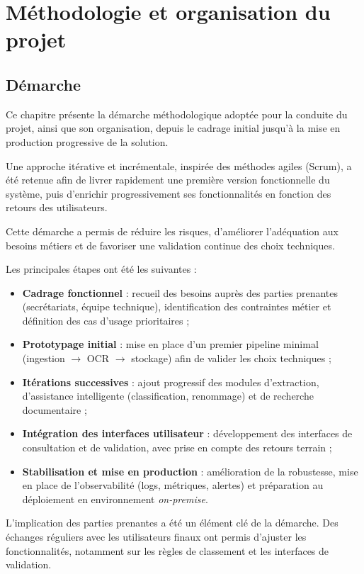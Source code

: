 \documentclass[12pt,a4paper]{report}
\begin{document}
\chapter{Méthodologie et organisation du projet}
\section{Démarche}
Ce chapitre présente la démarche méthodologique adoptée pour la conduite du projet, ainsi que son organisation, depuis le cadrage initial jusqu’à la mise en production progressive de la solution.

Une approche itérative et incrémentale, inspirée des méthodes agiles (Scrum), a été retenue afin de livrer rapidement une première version fonctionnelle du système, puis d’enrichir progressivement ses fonctionnalités en fonction des retours des utilisateurs.

Cette démarche a permis de réduire les risques, d’améliorer l’adéquation aux besoins métiers et de favoriser une validation continue des choix techniques.

Les principales étapes ont été les suivantes :
\begin{itemize}
  \item \textbf{Cadrage fonctionnel} : recueil des besoins auprès des parties prenantes (secrétariats, équipe technique), identification des contraintes métier et définition des cas d’usage prioritaires ;
  \item \textbf{Prototypage initial} : mise en place d’un premier pipeline minimal (ingestion $\rightarrow$ OCR $\rightarrow$ stockage) afin de valider les choix techniques ;
  \item \textbf{Itérations successives} : ajout progressif des modules d’extraction, d’assistance intelligente (classification, renommage) et de recherche documentaire ;
  \item \textbf{Intégration des interfaces utilisateur} : développement des interfaces de consultation et de validation, avec prise en compte des retours terrain ;
  \item \textbf{Stabilisation et mise en production} : amélioration de la robustesse, mise en place de l’observabilité (logs, métriques, alertes) et préparation au déploiement en environnement \textit{on-premise}.
\end{itemize}

L’implication des parties prenantes a été un élément clé de la démarche. Des échanges réguliers avec les utilisateurs finaux ont permis d’ajuster les fonctionnalités, notamment sur les règles de classement et les interfaces de validation.
\end{document}
